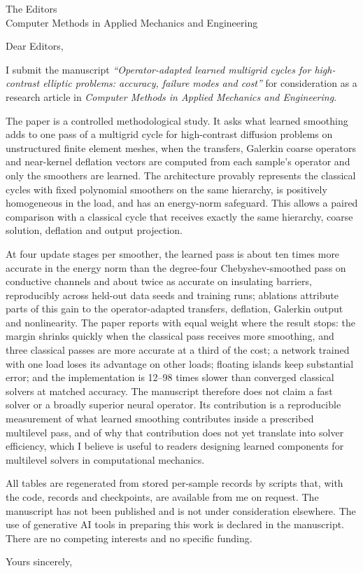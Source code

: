 \documentclass[11pt]{letter}
\begin{document}
\begin{letter}{The Editors\\Computer Methods in Applied Mechanics and Engineering}
\opening{Dear Editors,}

I submit the manuscript \emph{``Operator-adapted learned multigrid cycles for high-contrast elliptic problems: accuracy,
failure modes and cost''} for consideration as a research article in \emph{Computer Methods in Applied Mechanics and
Engineering}.

The paper is a controlled methodological study. It asks what learned smoothing adds to one pass of a multigrid cycle for
high-contrast diffusion problems on unstructured finite element meshes, when the transfers, Galerkin coarse operators and
near-kernel deflation vectors are computed from each sample's operator and only the smoothers are learned. The architecture
provably represents the classical cycles with fixed polynomial smoothers on the same hierarchy, is positively homogeneous in
the load, and has an energy-norm safeguard. This allows a paired comparison with a classical cycle that receives exactly the
same hierarchy, coarse solution, deflation and output projection.

At four update stages per smoother, the learned pass is about ten times more accurate in the energy norm than the
degree-four Chebyshev-smoothed pass on conductive channels and about twice as accurate on insulating barriers, reproducibly
across held-out data seeds and training runs; ablations attribute parts of this gain to the operator-adapted transfers,
deflation, Galerkin output and nonlinearity. The paper reports with equal weight where the result stops: the margin shrinks
quickly when the classical pass receives more smoothing, and three classical passes are more accurate at a third of the
cost; a network trained with one load loses its advantage on other loads; floating islands keep substantial error; and the
implementation is 12--98 times slower than converged classical solvers at matched accuracy. The manuscript therefore does
not claim a fast solver or a broadly superior neural operator. Its contribution is a reproducible measurement of what
learned smoothing contributes inside a prescribed multilevel pass, and of why that contribution does not yet translate into
solver efficiency, which I believe is useful to readers designing learned components for multilevel solvers in
computational mechanics.

All tables are regenerated from stored per-sample records by scripts that, with the code, records and checkpoints, are
available from me on request. The manuscript has not been published and is not under consideration elsewhere. The use of generative
AI tools in preparing this work is declared in the manuscript. There are no competing interests and no specific funding.

\closing{Yours sincerely,}
\end{letter}
\end{document}
